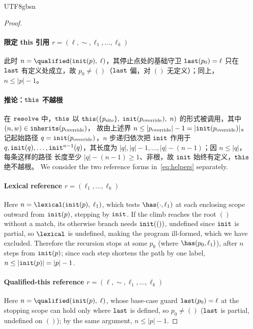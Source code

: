 \begin{CJK*}{UTF8}{gbsn}
\begin{proof}
  \paragraph{限定 this 引用 $r = (\ell, {\sim}, \ell_1, \ldots, \ell_k)$}
  此时 $n = \qualified(\init(p),\; \ell)$，其停止点处的基础守卫 $\mathtt{last}(p_0) = \ell$ 只在 $\mathtt{last}$ 有定义处成立，故 $p_0 \neq ()$（$\mathtt{last}$ 偏，对 $()$ 无定义）；同上，$n \leq |p| - 1$。

  \paragraph{推论：$\mathtt{this}$ 不越根}
  在 $\mathtt{resolve}$ 中，$\mathtt{this}$ 以
  $\mathtt{this}(\{p_{\mathrm{site}}\},\; \mathtt{init}(p_{\mathrm{override}}),\; n)$
  的形式被调用，其中 $(n, w) \in \mathtt{inherits}(p_{\mathrm{override}})$，
  故由上述界 $n \leq |p_{\mathrm{override}}| - 1 = |\mathtt{init}(p_{\mathrm{override}})|$。
  记起始路径 $q = \mathtt{init}(p_{\mathrm{override}})$，$n$ 步递归依次把 $\mathtt{init}$
  作用于 $q, \mathtt{init}(q), \ldots, \mathtt{init}^{n-1}(q)$，其长度为
  $|q|, |q| - 1, \ldots, |q| - (n - 1)$；因 $n \leq |q|$，每条这样的路径
  长度至少 $|q| - (n - 1) \geq 1$、非根，故 $\mathtt{init}$ 始终有定义，$\mathtt{this}$ 绝不越根。
  \else
  We consider the two reference forms in~\eqref{eq:helpers} separately.

  \paragraph{Lexical reference $r = (\ell_1, \ldots, \ell_k)$}
  Here $n = \lexical(\init(p),\; \ell_1)$, which tests $\has(\cdot, \ell_1)$ at each
  enclosing scope outward from $\mathtt{init}(p)$, stepping by $\mathtt{init}$.
  If the climb reaches the root $()$ without a match, its otherwise branch needs $\mathtt{init}(())$,
  undefined since $\mathtt{init}$ is partial, so $\lexical$ is undefined,
  making the program ill-formed, which we have excluded.
  Therefore the recursion stops at some $p_0$ (where $\has(p_0, \ell_1)$), after $n$ steps
  from $\mathtt{init}(p)$; since each step shortens the path by one label,
  $n \leq |\mathtt{init}(p)| = |p| - 1$.

  \paragraph{Qualified-this reference $r = (\ell, {\sim}, \ell_1, \ldots, \ell_k)$}
  Here $n = \qualified(\init(p),\; \ell)$, whose base-case guard $\mathtt{last}(p_0) = \ell$ at the
  stopping scope can hold only where $\mathtt{last}$ is defined, so $p_0 \neq ()$ ($\mathtt{last}$ is partial, undefined
  on $()$); by the same argument, $n \leq |p| - 1$.


\end{proof}
\end{CJK*}
